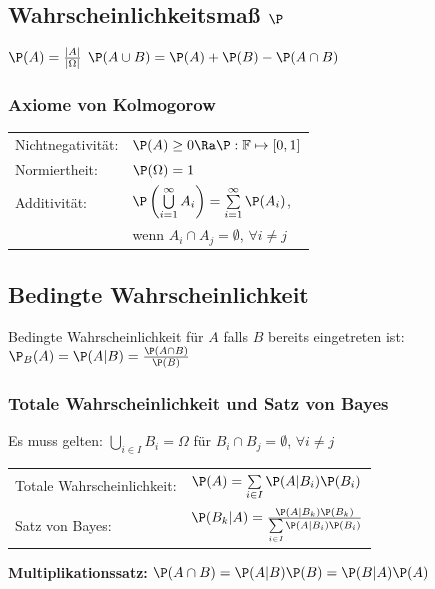 \documentclass[english]{latex4ei/latex4ei_sheet}
\begin{document}
\begin{sectionbox}
	\subsection{Wahrscheinlichkeitsmaß $\P$}
	$\P(A) = \frac{|A|}{|\Omega|}$ \hfill $\P(A \cup B) = \P(A) + \P(B) - \P(A \cap B)$\\
	\subsubsection{Axiome von Kolmogorow}
	\begin{tabular}{ll}
		Nichtnegativität: & $\P(A) \geq 0 \Ra \P:\mathbb F \mapsto [0,1]$ \\
		Normiertheit: & $\P(\Omega) = 1$ \\
		Additivität: & $\P\left(\bigcup\limits_{i=1}^{\infty} A_i \right) = \sum\limits_{i=1}^{\infty} \P(A_i)$, \\
		& wenn $A_i \cap A_j = \emptyset$, $\forall i \neq j$ \\
	\end{tabular}
\end{sectionbox}

\begin{sectionbox}
	\subsection{Bedingte Wahrscheinlichkeit}
	Bedingte Wahrscheinlichkeit für $A$ falls $B$ bereits eingetreten ist:\\
	$\P_B(A) = \P(A|B) = \frac{\P(A \cap B)}{\P(B)}$ %
	
	\subsubsection{Totale Wahrscheinlichkeit und Satz von Bayes}
	Es muss gelten: $\bigcup\limits_{i \in I} B_i = \Omega$ für $B_i \cap B_j = \emptyset$, $\forall i \neq j$ \\
	\begin{tabular}{ll}
		Totale Wahrscheinlichkeit: & $\P(A) = \sum\limits_{i \in I} \P(A|B_i)\P(B_i)$\\
		Satz von Bayes: & $\P(B_k | A) = \frac{\P(A | B_k)\P(B_k)}{\sum\limits_{i \in I} \P(A|B_i) \P(B_i)}$\\
	\end{tabular}

	\textbf{Multiplikationssatz:} 	$\P(A \cap B) = \P(A|B)\P(B) = \P(B|A)\P(A)$
\end{sectionbox}
\end{document}
